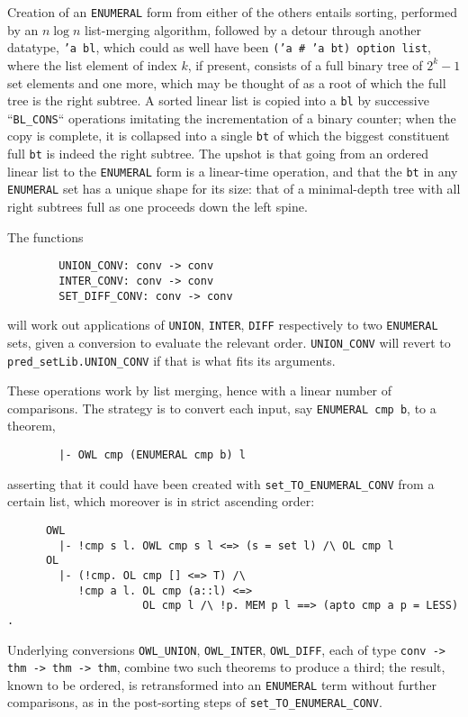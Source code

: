 Creation of an {\tt ENUMERAL} form from either of the others entails
sorting, performed by an $n\log n$ list-merging algorithm, followed by
a detour through another datatype, {\tt 'a bl}, which could as well have been
{\tt ('a \# 'a bt) option list}, where the list element of index $k$, if
present, consists of a full binary tree of $2^k - 1$ set elements and one
more, which may be thought of as a root of which the full tree is the
right subtree. A sorted linear list is copied into a {\tt bl} by successive
``{\tt BL_CONS}`` operations imitating the incrementation of a binary counter;
when the copy is complete, it is collapsed into a single {\tt bt} of
which the biggest constituent full {\tt bt} is indeed the right subtree.
The upshot is that going from an ordered linear list to the
{\tt ENUMERAL} form is a linear-time operation, and that the {\tt bt} in
any {\tt ENUMERAL} set has a unique shape for its size: that of a
minimal-depth tree with all right subtrees full as one proceeds down the
left spine.

 The functions
\begin{verbatim}
        UNION_CONV: conv -> conv
        INTER_CONV: conv -> conv
        SET_DIFF_CONV: conv -> conv
\end{verbatim}
will work out applications of {\tt UNION}, {\tt INTER}, {\tt DIFF}
respectively to two {\tt ENUMERAL} sets, given a conversion to evaluate
the relevant order. {\tt UNION_CONV} will revert to {\tt pred_setLib.UNION_CONV}
if that is what fits its arguments.

These operations work by list merging, hence with a linear number of
comparisons. The strategy is to convert each input, say
{\tt ENUMERAL cmp b}, to a theorem,
\begin{verbatim}
        |- OWL cmp (ENUMERAL cmp b) l
\end{verbatim}
asserting that it could have been created with {\tt set_TO_ENUMERAL_CONV}
from a certain list, which moreover is in strict ascending order:
\begin{verbatim}
      OWL
        |- !cmp s l. OWL cmp s l <=> (s = set l) /\ OL cmp l
      OL
        |- (!cmp. OL cmp [] <=> T) /\
           !cmp a l. OL cmp (a::l) <=>
                     OL cmp l /\ !p. MEM p l ==> (apto cmp a p = LESS) .
\end{verbatim}
Underlying conversions {\tt OWL_UNION}, {\tt OWL_INTER}, {\tt OWL_DIFF},
each of type {\tt conv -> thm -> thm -> thm}, combine two such theorems
to produce a third; the result, known to be ordered, is retransformed
into an {\tt ENUMERAL} term without further comparisons, as in the
post-sorting steps of {\tt set_TO_ENUMERAL_CONV}.

